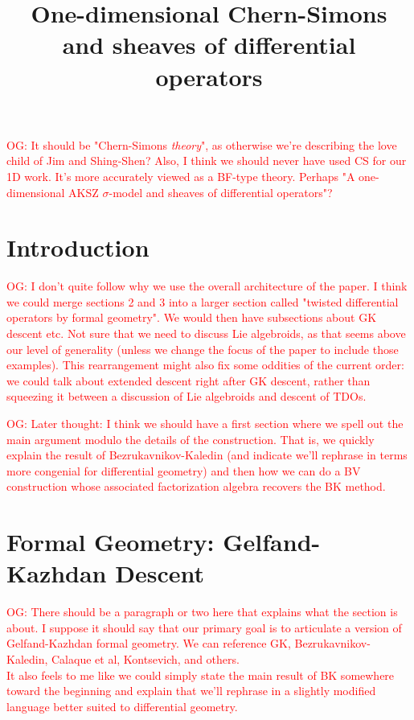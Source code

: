 \documentclass[10pt]{amsart}
\title{One-dimensional Chern-Simons and sheaves of differential operators}
\def\owen{\textcolor{red}{OG: }\textcolor{red}}
\begin{document}
\maketitle
\tableofcontents

\owen{It should be "Chern-Simons {\em theory}", as otherwise we're describing the love child of Jim and Shing-Shen? Also, I think we should never have used CS for our 1D work. It's more accurately viewed as a BF-type theory. Perhaps "A one-dimensional AKSZ $\sigma$-model and sheaves of differential operators"?}

\section{Introduction}

\owen{I don't quite follow why we use the overall architecture of the paper. I think we could merge sections 2 and 3 into a larger section called "twisted differential operators by formal geometry". We would then have subsections about GK descent etc. Not sure that we need to discuss Lie algebroids, as that seems above our level of generality (unless we change the focus of the paper to include those examples). This rearrangement might also fix some oddities of the current order: we could talk about extended descent right after GK descent, rather than squeezing it between a discussion of Lie algebroids and descent of TDOs.}

\owen{Later thought: I think we should have a first section where we spell out the main argument modulo the details of the construction. That is, we quickly explain the result of Bezrukavnikov-Kaledin (and indicate we'll rephrase in terms more congenial for differential geometry) and then how we can do a BV construction whose associated factorization algebra recovers the BK method.}

\section{Formal Geometry: Gelfand-Kazhdan Descent}

\owen{There should be a paragraph or two here that explains what the section is about. I suppose it should say that our primary goal is to articulate a version of Gelfand-Kazhdan formal geometry. We can reference GK, Bezrukavnikov-Kaledin, Calaque et al, Kontsevich, and others.\\
It also feels to me like we could simply state the main result of BK somewhere toward the beginning and explain that we'll rephrase in a slightly modified language better suited to differential geometry.}
\end{document}

